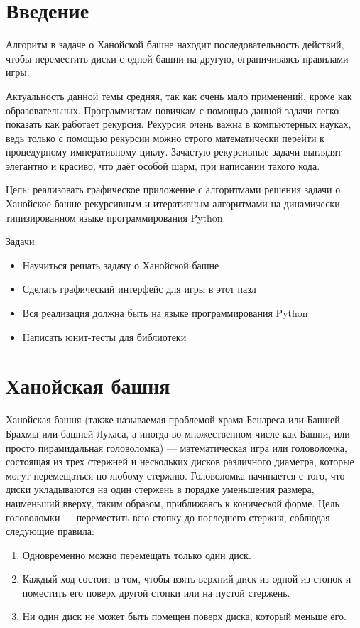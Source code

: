 \section*{Введение}
Алгоритм в задаче о Ханойской башне находит последовательность действий, чтобы
переместить диски с одной башни на другую, ограничиваясь правилами игры.

Актуальность данной темы средняя, так как очень мало применений, кроме как
образовательных. Программистам-новичкам с помощью данной задачи легко
показать как работает рекурсия. Рекурсия очень важна в компьютерных
науках, ведь только с помощью рекурсии можно строго математически
перейти к процедурному-императивному циклу. Зачастую рекурсивные задачи
выглядят элегантно и красиво, что даёт особой шарм, при написании такого
кода.

Цель: реализовать графическое приложение с алгоритмами решения задачи о
Ханойское башне рекурсивным и итеративным алгоритмами на динамически
типизированном языке программирования Python\cite{Python}.

Задачи:
\begin{itemize}
	\item Научиться решать задачу о Ханойской башне
	\item Сделать графический интерфейс для игры в этот пазл
	\item Вся реализация должна быть на языке программирования Python
	\item Написать юнит-тесты для библиотеки
\end{itemize}
\section{Ханойская башня}
Ханойская башня (также называемая проблемой храма Бенареса или Башней
Брахмы или башней Лукаса, а иногда во множественном числе как Башни, или
просто пирамидальная головоломка) --- математическая игра или головоломка,
состоящая из трех стержней и нескольких дисков различного диаметра,
которые могут перемещаться по любому стержню. Головоломка начинается с того, что
диски укладываются на один стержень в порядке уменьшения размера, наименьший
вверху, таким образом, приближаясь к конической форме. Цель головоломки ---
переместить всю стопку до последнего стержня, соблюдая следующие правила:

\begin{enumerate}
	\item Одновременно можно перемещать только один диск.
	\item Каждый ход состоит в том, чтобы взять верхний диск из одной из стопок
	      и поместить его поверх другой стопки или на пустой стержень.
	\item Ни один диск не может быть помещен поверх диска, который меньше его.
\end{enumerate}

